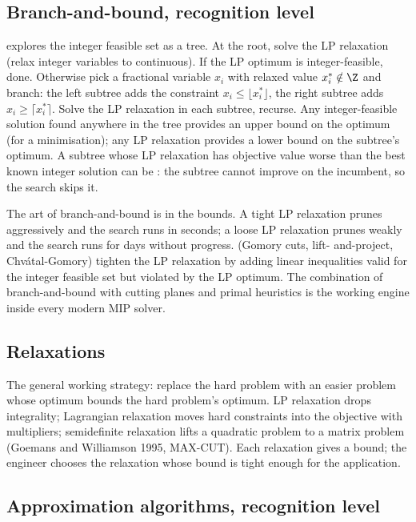 \subsection{Branch-and-bound, recognition level}

 explores the integer feasible set as a
tree. At the root, solve the LP relaxation (relax integer
variables to continuous). If the LP optimum is integer-feasible,
done. Otherwise pick a fractional variable $x_{i}$ with relaxed
value $x_{i}^{*} \notin \Z$ and branch: the left subtree adds the
constraint $x_{i} \leq \lfloor x_{i}^{*} \rfloor$, the right
subtree adds $x_{i} \geq \lceil x_{i}^{*} \rceil$. Solve the LP
relaxation in each subtree, recurse. Any integer-feasible
solution found anywhere in the tree provides an upper bound on
the optimum (for a minimisation); any LP relaxation provides a
lower bound on the subtree's optimum. A subtree whose LP
relaxation has objective value worse than the best known integer
solution can be : the subtree cannot improve on
the incumbent, so the search skips it.

The art of branch-and-bound is in the bounds. A tight LP
relaxation prunes aggressively and the search runs in seconds; a
loose LP relaxation prunes weakly and the search runs for days
without progress.  (Gomory cuts, lift-
and-project, Chvátal-Gomory) tighten the LP relaxation by adding
linear inequalities valid for the integer feasible set but
violated by the LP optimum. The combination of branch-and-bound
with cutting planes and primal heuristics is the working
 engine inside every modern MIP solver.

\subsection{Relaxations}

The general working strategy: replace the hard problem with an
easier problem whose optimum bounds the hard problem's optimum.
LP relaxation drops integrality; Lagrangian relaxation moves
hard constraints into the objective with multipliers; semidefinite
relaxation lifts a quadratic problem to a matrix problem (Goemans
and Williamson 1995, MAX-CUT). Each relaxation gives a bound; the
engineer chooses the relaxation whose bound is tight enough for
the application.

\subsection{Approximation algorithms, recognition level}

